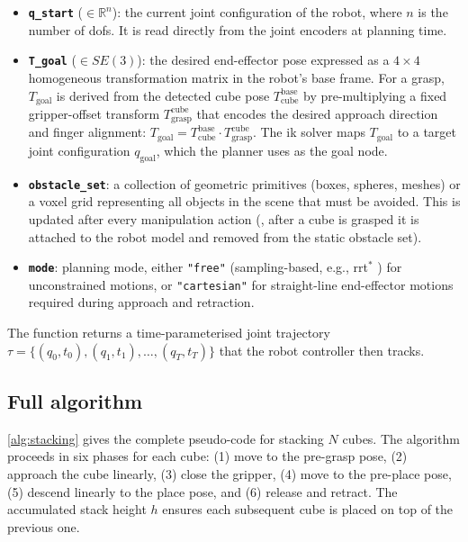 \documentclass{article}
\begin{document}
\begin{itemize}[leftmargin=*]
  \item \textbf{\texttt{q\_start}} ($\in \mathbb{R}^n$): the current joint configuration of
        the robot, where $n$ is the number of \acp{dof}.
        It is read directly from the joint encoders at planning time.

  \item \textbf{\texttt{T\_goal}} ($\in SE(3)$): the desired end-effector pose expressed as
        a $4{\times}4$ homogeneous transformation matrix in the robot's base frame.
        For a grasp, $T_{\text{goal}}$ is derived from the detected cube pose
        $T_{\text{cube}}^{\text{base}}$ by pre-multiplying a fixed gripper-offset transform
        $T_{\text{grasp}}^{\text{cube}}$ that encodes the desired approach direction and
        finger alignment:
        $T_{\text{goal}} = T_{\text{cube}}^{\text{base}} \cdot T_{\text{grasp}}^{\text{cube}}$.
        The \ac{ik} solver maps $T_{\text{goal}}$ to a target joint configuration
        $q_{\text{goal}}$, which the planner uses as the goal node.

  \item \textbf{\texttt{obstacle\_set}}: a collection of geometric primitives (boxes, spheres,
        meshes) or a voxel grid representing all objects in the scene that must be avoided.
        This is updated after every manipulation action (\eg, after a cube is grasped it is
        attached to the robot model and removed from the static obstacle set).

  \item \textbf{\texttt{mode}}: planning mode, either \texttt{"free"} (sampling-based,
        e.g., \ac{rrt}$^*$ \citep{karaman2011sampling}) for unconstrained motions, or
        \texttt{"cartesian"} for straight-line end-effector motions required during
        approach and retraction.
\end{itemize}

The function returns a time-parameterised joint trajectory
$\tau = \{(q_0, t_0), (q_1, t_1), \ldots, (q_T, t_T)\}$
that the robot controller then tracks.

\subsection{Full algorithm}

\cref{alg:stacking} gives the complete pseudo-code for stacking $N$ cubes.
The algorithm proceeds in six phases for each cube:
(1) move to the pre-grasp pose,
(2) approach the cube linearly,
(3) close the gripper,
(4) move to the pre-place pose,
(5) descend linearly to the place pose, and
(6) release and retract.
The accumulated stack height $h$ ensures each subsequent cube is placed on top of the
previous one.
\end{document}
